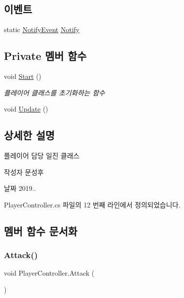 \subsection*{이벤트}
\begin{DoxyCompactItemize}
\item 
static \mbox{\hyperlink{class_player_controller_a934c7f80b80276620cd60eaaeea7520e}{Notify\+Event}} \mbox{\hyperlink{class_player_controller_af13292e01756741118500035511fc88d}{Notify}}
\end{DoxyCompactItemize}
\subsection*{Private 멤버 함수}
\begin{DoxyCompactItemize}
\item 
void \mbox{\hyperlink{class_player_controller_ae1117d9c4da3193181cddad2c814e467}{Start}} ()
\begin{DoxyCompactList}\small\item\em 플레이어 클래스를 초기화하는 함수 \end{DoxyCompactList}\item 
void \mbox{\hyperlink{class_player_controller_ae8bc83dffb99867a04be016473ed2c43}{Update}} ()
\end{DoxyCompactItemize}


\subsection{상세한 설명}
플레이어 담당 일진 클래스 

\begin{DoxyAuthor}{작성자}
문성후 
\end{DoxyAuthor}
\begin{DoxyDate}{날짜}
2019.. 
\end{DoxyDate}


Player\+Controller.\+cs 파일의 12 번째 라인에서 정의되었습니다.



\subsection{멤버 함수 문서화}
\mbox{\label{class_player_controller_a473a610cfe2a374d5cb39b3c44881d11}} 
\subsubsection{\texorpdfstring{Attack()}{Attack()}}
{\footnotesize\ttfamily void Player\+Controller.\+Attack (\begin{DoxyParamCaption}{ }\end{DoxyParamCaption})\hspace{0.3cm}{\ttfamily [inline]}}




